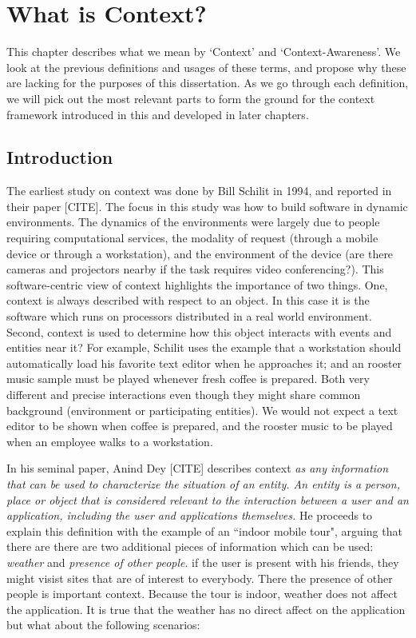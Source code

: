 \chapter{What is Context?}

This chapter describes what we mean by `Context' and `Context-Awareness'. We look at the previous definitions and usages of these terms, and propose why these are lacking for the purposes of this dissertation. As we go through each definition, we will pick out the most relevant parts to form the ground for the context framework introduced in this and developed in later chapters.

\section{Introduction}

The earliest study on context was done by Bill Schilit in 1994, and reported in their paper [CITE]. The focus in this study was how to build software in dynamic environments. The dynamics of the environments were largely due to people requiring computational services, the modality of request (through a mobile device or through a workstation), and the environment of the device (are there cameras and projectors nearby if the task requires video conferencing?). This software-centric view of context highlights the importance of two things. One, context is always described with respect to an object. In this case it is the software which runs on processors distributed in a real world environment. Second, context is used to determine how this object interacts with events and entities near it? For example, Schilit uses the example that a workstation should automatically load his favorite text editor when he approaches it; and an rooster music sample must be played whenever fresh coffee is prepared. Both very different and precise interactions even though they might share common background (environment or participating entities). We would not expect a text editor to be shown when coffee is prepared, and the rooster music to be played when an employee walks to a workstation.

In his seminal paper, Anind Dey [CITE] describes context \textit{as any information that can be used to characterize the situation of an entity. An entity is a person, place or object that is considered relevant to the interaction between a user and an application, including the user and applications themselves.} He proceeds to explain this definition with the example of an ``indoor mobile tour", arguing that there are there are two additional pieces of information which can be used: \textit{weather} and \textit{presence of other people}. if the user is present with his friends, they might visist sites that are of interest to everybody. There the presence of other people is important context. Because the tour is indoor, weather does not affect the application. It is true that the weather has no direct affect on the application but what about the following scenarios:


